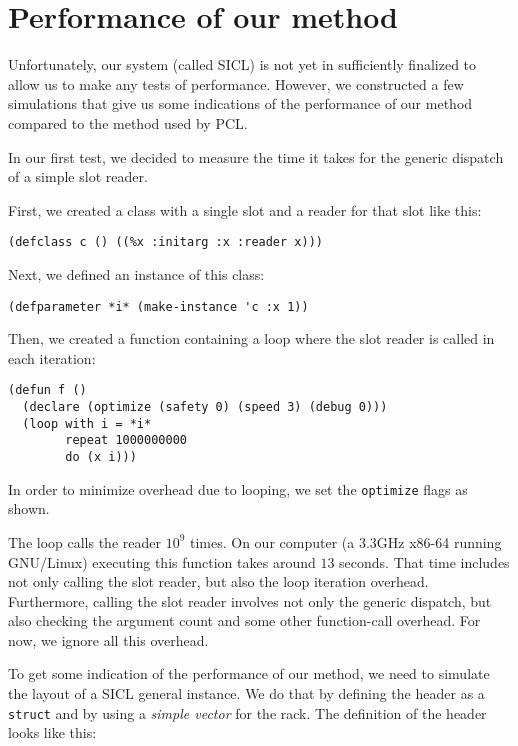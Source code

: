 \section{Performance of our method}

Unfortunately, our system (called SICL) is not yet in sufficiently
finalized to allow us to make any tests of performance.  However, we
constructed a few simulations that give us some indications of the
performance of our method compared to the method used by PCL.

In our first test, we decided to measure the time it takes for the
generic dispatch of a simple slot reader. 

First, we created a class with a single slot and a reader for that
slot like this:

\begin{verbatim}
(defclass c () ((%x :initarg :x :reader x)))  
\end{verbatim}

Next, we defined an instance of this class:

\begin{verbatim}
(defparameter *i* (make-instance 'c :x 1))
\end{verbatim}

Then, we created a function containing a loop where the slot reader is
called in each iteration: 

\begin{verbatim}
(defun f ()
  (declare (optimize (safety 0) (speed 3) (debug 0)))
  (loop with i = *i*
        repeat 1000000000
        do (x i)))
\end{verbatim}

In order to minimize overhead due to looping, we set the
\texttt{optimize} flags as shown. 

The loop calls the reader $10^9$ times.  On our computer (a 3.3GHz
x86-64 running GNU/Linux) executing this function takes around $13$
seconds.  That time includes not only calling the slot reader, but
also the loop iteration overhead.  Furthermore, calling the slot
reader involves not only the generic dispatch, but also checking the
argument count and some other function-call overhead.  For now, we
ignore all this overhead.

To get some indication of the performance of our method, we need to
simulate the layout of a SICL general instance.  We do that by
defining the header as a \cl{} \texttt{struct} and by using a
\emph{simple vector} for the rack.  The definition of the header looks
like this:

